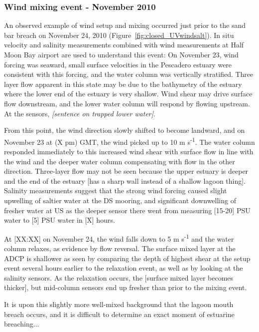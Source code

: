 
\subsubsection{Wind mixing event - November 2010} \label{sssec:WindMixNov10}

An observed example of wind setup and mixing occurred just prior to the sand bar breach on November 24, 2010 (Figure~\ref{fig:closed_UVwindsalt}). In situ velocity and salinity measurements combined with wind measurements at Half Moon Bay airport are used to understand this event: 
On November 23, wind forcing was seaward, small surface velocities in the Pescadero estuary were consistent with this forcing, and the water column was vertically stratified. Three layer flow apparent in this state may be due to the bathymetry of the estuary where the lower end of the estuary is very shallow. Wind shear may drive surface flow downstream, and the lower water column will respond by flowing upstream.
At the sensors, \emph{[sentence on trapped lower water]}.

From this point, the wind direction slowly shifted to become landward, and on November 23 at (X pm) GMT, the wind picked up to 10 m s\textsuperscript{-1}. The water column responded immediately to this increased wind shear with surface flow in line with the wind and the  deeper water column compensating with flow in the other direction. Three-layer flow may not be seen because the upper estuary is deeper and the end of the estuary [has a sharp wall instead of a shallow lagoon thing]. Salinity measurements suggest that the strong wind forcing caused slight upwelling of saltier water at the DS mooring, and significant downwelling of fresher water at US as the deeper sensor there went from measuring [15-20] PSU water to [5] PSU water in [X] hours.

At [XX:XX] on November 24, the wind falls down to 5 m
s\textsuperscript{-1} and the water column relaxes, as evidence by flow
reversal. The surface mixed layer at the ADCP is shallower as seen by
comparing the depth of highest shear at the setup event several hours
earlier to the relaxation event, as well as by looking at the salinity
sensors. As the relaxation occurs, the [surface mixed layer becomes
thicker], but mid-column sensors end up fresher than prior to the mixing
event.

It is upon this slightly more well-mixed background that the lagoon
mouth breach occurs, and it is difficult to determine an exact moment of
estuarine breaching...

